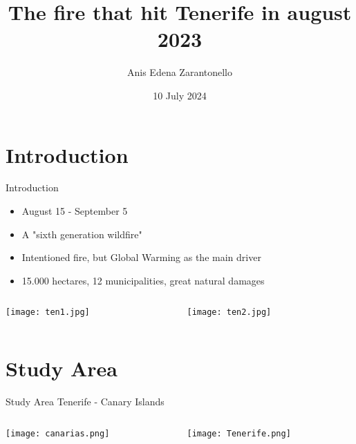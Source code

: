 \documentclass{beamer}
\title{The fire that hit Tenerife in august 2023}
\author{Anis Edena Zarantonello}
\date{10 July 2024}
\begin{document}
\maketitle %



\section{Introduction}
\begin{frame}{Introduction}
\begin{itemize}
    \item August 15 - September 5
    \item A "sixth generation wildfire"
    \item Intentioned fire, but Global Warming as the main driver
    \item 15.000 hectares, 12 municipalities, great natural damages
\end{itemize}
\begin{columns}
\begin{column}{0.5\textwidth}
\begin{center}
    \texttt{[image: ten1.jpg]}
\end{center}
\end{column}
\begin{column}{0.5\textwidth}  
    \begin{center}
     \texttt{[image: ten2.jpg]}
     \end{center}
\end{column}
\end{columns}
\end{frame} 

\section{Study Area}
\begin{frame}{Study Area}
Tenerife - Canary Islands
\begin{columns}
\begin{column}{0.5\textwidth}
\begin{center}
    \texttt{[image: canarias.png]}
\end{center}
\end{column}
\begin{column}{0.5\textwidth}  
    \begin{center}
     \texttt{[image: Tenerife.png]}
     \end{center}
\end{column}
\end{columns}
    
\end{frame}
\end{document}
